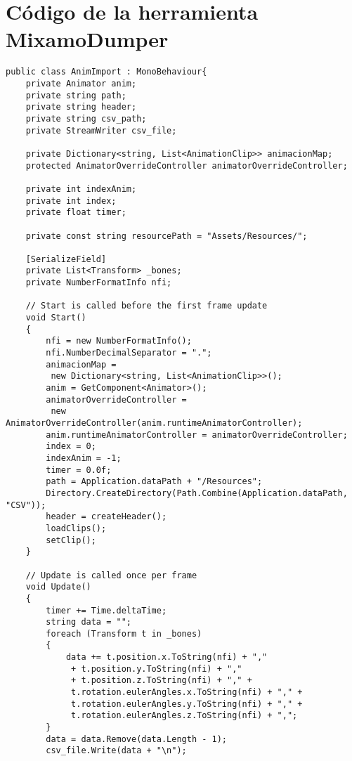 \chapter{Código de la herramienta MixamoDumper}
\label{appendix:MixamoDumperCode}

\begin{lstlisting}[style=customcsharp, caption={Código de la herramienta MixamoDumper}, label={lst:MixamoDumperCode}]
public class AnimImport : MonoBehaviour{
    private Animator anim;
    private string path;
    private string header;
    private string csv_path;
    private StreamWriter csv_file;

    private Dictionary<string, List<AnimationClip>> animacionMap;
    protected AnimatorOverrideController animatorOverrideController;

    private int indexAnim;
    private int index;
    private float timer;

    private const string resourcePath = "Assets/Resources/";

    [SerializeField]
    private List<Transform> _bones;
    private NumberFormatInfo nfi;

    // Start is called before the first frame update
    void Start()
    {
        nfi = new NumberFormatInfo();
        nfi.NumberDecimalSeparator = ".";
        animacionMap = 
         new Dictionary<string, List<AnimationClip>>();
        anim = GetComponent<Animator>();
        animatorOverrideController =
         new AnimatorOverrideController(anim.runtimeAnimatorController);
        anim.runtimeAnimatorController = animatorOverrideController;
        index = 0;
        indexAnim = -1;
        timer = 0.0f;
        path = Application.dataPath + "/Resources";
        Directory.CreateDirectory(Path.Combine(Application.dataPath, "CSV"));
        header = createHeader();
        loadClips();
        setClip();
    }

    // Update is called once per frame
    void Update()
    {
        timer += Time.deltaTime;
        string data = "";
        foreach (Transform t in _bones)
        {
            data += t.position.x.ToString(nfi) + ","
             + t.position.y.ToString(nfi) + "," 
             + t.position.z.ToString(nfi) + "," + 
             t.rotation.eulerAngles.x.ToString(nfi) + "," + 
             t.rotation.eulerAngles.y.ToString(nfi) + "," + 
             t.rotation.eulerAngles.z.ToString(nfi) + ",";
        }
        data = data.Remove(data.Length - 1);
        csv_file.Write(data + "\n");



\end{lstlisting}
